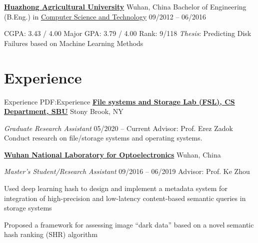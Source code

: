 \documentclass[letterpaper,10pt,oneside]{article}
\begin{document}
\begin{body}
\BigGap
\href{http://www.hzau.edu.cn/en/HOME.htm}
{\textbf{Huazhong Agricultural University}}
\hfill
Wuhan, China
\GapNoBreak
\BulletItem
Bachelor of Engineering (B.Eng.) in
\href{http://coi.hzau.edu.cn/}
{Computer Science and Technology}
\hfill
09/2012 -- 06/2016
\begin{detail}

\SubBulletItem
CGPA: 3.43 / 4.00 \quad Major GPA: 3.79 / 4.00 \quad Rank: 9/118
\SubBulletItem
\emph{Thesis}: Predicting Disk Failures based on Machine Learning Methods
\end{detail}


\section
{Experience}
{Experience}
{PDF:Experience}
\href{https://www.fsl.cs.stonybrook.edu/}
{\textbf{File systems and Storage Lab (FSL), CS Department, SBU}}
\hfill
Stony Brook, NY

\emph{Graduate Research Assistant}
\hfill
05/2020 --
Current
\GapNoBreak
Advisor: Prof. Erez Zadok
\BulletItem
Conduct research on file/storage systems and operating systems.



\BigGap
\href{http://english.wnlo.hust.edu.cn/}
{\textbf{Wuhan National Laboratory for Optoelectronics}}
\hfill
Wuhan, China

\emph{Master's Student/Research Assistant}
\hfill
09/2016 --
06/2019
\GapNoBreak
Advisor: Prof. Ke Zhou

\GapNoBreak
\BulletItem
Used deep learning hash to design and implement a metadata system for integration of high-precision and low-latency content-based semantic queries in storage systems

\GapNoBreak
\BulletItem
Proposed a framework for assessing image ``dark data'' based on a novel semantic hash ranking (SHR) algorithm


\end{body}
\end{document}
